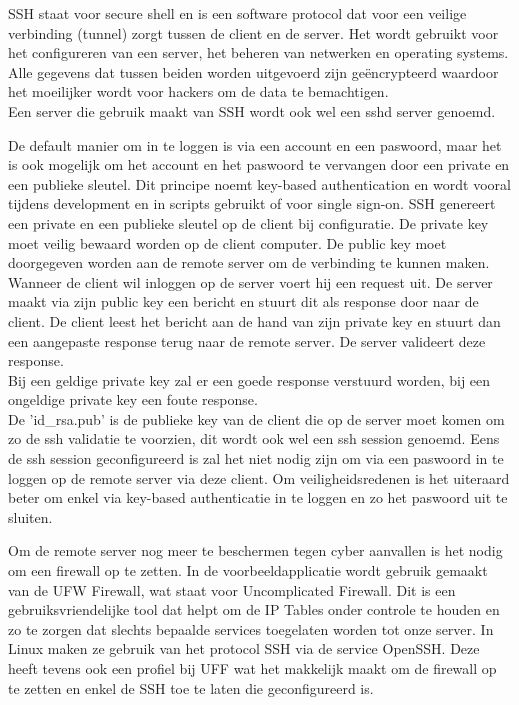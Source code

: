             SSH staat voor secure shell en is een software protocol dat voor een veilige verbinding (tunnel) zorgt tussen de client en de server. Het wordt gebruikt voor het configureren van een server, het beheren van netwerken en operating systems. Alle gegevens dat tussen beiden worden uitgevoerd zijn geëncrypteerd waardoor het moeilijker wordt voor hackers om de data te bemachtigen.\\
            Een server die gebruik maakt van SSH wordt ook wel een sshd server genoemd. 
            
            De default manier om in te loggen is via een account en een paswoord, maar het is ook mogelijk om het account en het paswoord te vervangen door een private en een publieke sleutel. Dit principe noemt key-based authentication en wordt vooral tijdens development en in scripts gebruikt of voor single sign-on. SSH genereert een private en een publieke sleutel op de client bij configuratie. De private key moet veilig bewaard worden op de client computer. De public key moet doorgegeven worden aan de remote server om de verbinding te kunnen maken.\\
            Wanneer de client wil inloggen op de server voert hij een request uit. De server maakt via zijn public key een bericht en stuurt dit als response door naar de client. De client leest het bericht aan de hand van zijn private key en stuurt dan een aangepaste response terug naar de remote server. De server valideert deze response.\\
            Bij een geldige private key zal er een goede response verstuurd worden, bij een ongeldige private key een foute response.
            \\
            De 'id\_rsa.pub' is de publieke key van de client die op de server moet komen om zo de ssh validatie te voorzien, dit wordt ook wel een ssh session genoemd. Eens de ssh session geconfigureerd is zal het niet nodig zijn om via een paswoord in te loggen op de remote server via deze client.
            Om veiligheidsredenen is het uiteraard beter om enkel via key-based authenticatie in te loggen en zo het paswoord uit te sluiten.
            
            Om de remote server nog meer te beschermen tegen cyber aanvallen is het nodig om een firewall op te zetten. In de voorbeeldapplicatie wordt gebruik gemaakt van de UFW Firewall, wat staat voor Uncomplicated Firewall. Dit is een gebruiksvriendelijke tool dat helpt om de IP Tables onder controle te houden en zo te zorgen dat slechts bepaalde services toegelaten worden tot onze server.
            In Linux maken ze gebruik van het protocol SSH via de service OpenSSH. Deze heeft tevens ook een profiel bij UFF wat het makkelijk maakt om de firewall op te zetten en enkel de SSH toe te laten die geconfigureerd is.
            
